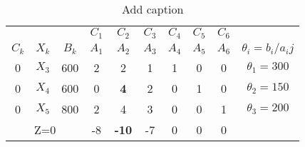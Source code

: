 \begin{table}[ht]
  \centering
  \caption{Add caption}
    \begin{tabular}{crr|cccccc|c}
    \hline
    \hline
           & \multicolumn{1}{c}{} & \multicolumn{1}{c}{} & $C_1$  & $C_2$  & $C_3$  & $C_4$  & $C_5$  & \multicolumn{1}{c}{$C_6$} &  \bigstrut[t]\\
    $C_k$  & \multicolumn{1}{c}{$X_k$} & \multicolumn{1}{c|}{$B_k$} & $A_1$  & $A_2$  & $A_3$  & $A_4$  & $A_5$  & $A_6$  & $\theta_i = b_i/a_ij$ \bigstrut[b]\\
    \hline
    0      & \multicolumn{1}{c}{$X_3$} & \multicolumn{1}{c|}{600} & 2      & 2      & 1      & 1      & 0      & 0      & $\theta_1 = 300$ \bigstrut\\
\cline{5-5}    0      & \multicolumn{1}{c}{\textcolor[rgb]{ 1,  0,  0}{\boldmath{}\textbf{$X_4$}\unboldmath{}}} & \multicolumn{1}{c|}{600} & \multicolumn{1}{c|}{0} & \multicolumn{1}{c|}{\textbf{4}} & 2      & 0      & 1      & 0      & \boldmath{}\textbf{$\theta_2 = 150$}\unboldmath{} \bigstrut\\
\cline{5-5}    0      & \multicolumn{1}{c}{$X_5$} & \multicolumn{1}{c|}{800} & 2      & 4      & 3      & 0      & 0      & 1      & $\theta_3 = 200$ \bigstrut\\
    \hline
    \multicolumn{3}{c|}{Z=0} & -8     & \textcolor[rgb]{ 0,  0,  1}{\textbf{-10}} & -7     & 0      & 0      & 0      &  \bigstrut\\
    \hline
    \hline
    \end{tabular}%
  \label{tab:addlabel}%
\end{table}%
